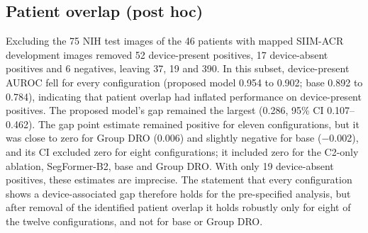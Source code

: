 \documentclass{ieeeaccess}
\begin{document}
\subsection{Patient overlap (post hoc)}
\label{sec:res-overlap}
Excluding the 75 NIH test images of the 46 patients with mapped SIIM-ACR development images removed 52 device-present positives, 17 device-absent positives and 6 negatives, leaving 37, 19 and 390. In this subset, device-present AUROC fell for every configuration (proposed model 0.954 to 0.902; base 0.892 to 0.784), indicating that patient overlap had inflated performance on device-present positives. The proposed model's gap remained the largest (0.286, 95\% CI 0.107--0.462). The gap point estimate remained positive for eleven configurations, but it was close to zero for Group DRO (0.006) and slightly negative for base ($-$0.002), and its CI excluded zero for eight configurations; it included zero for the C2-only ablation, SegFormer-B2, base and Group DRO. With only 19 device-absent positives, these estimates are imprecise. The statement that every configuration shows a device-associated gap therefore holds for the pre-specified analysis, but after removal of the identified patient overlap it holds robustly only for eight of the twelve configurations, and not for base or Group DRO.
\end{document}
